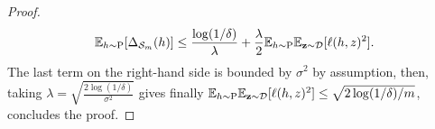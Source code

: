 \begin{noaddcontents}
\begin{proof}
        \[\mathbb{E}_{h\sim \mathrm{P}}[\Delta_{\mathcal{S}_m}(h)] \leq \frac{\log(1/\delta)}{\lambda} + \frac{\lambda}{2}\mathbb{E}_{h\sim\mathrm{P}}\mathbb{E}_{\mathbf{z}\sim\mathcal{D}}[\ell(h,z)^2]. \]
        The last term on the right-hand side is bounded by $\sigma^2$ by assumption, then, taking $\lambda= \sqrt{\frac{2\log(1/\delta)}{\sigma^2}}$ gives finally $\mathbb{E}_{h\sim\mathrm{P}}\mathbb{E}_{\mathbf{z}\sim\mathcal{D}}[\ell(h,z)^2] \leq \sqrt{2\log(1/\delta)/m}$, concludes the proof.
    \end{proof}
\end{noaddcontents}